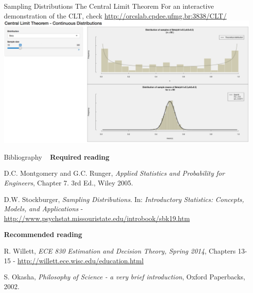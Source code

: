 \documentclass[t]{beamer}
\begin{document}
\begin{ftst}
{Sampling Distributions}
{The Central Limit Theorem}
For an interactive demonstration of the CLT, check 
{\small\url{http://orcslab.cpdee.ufmg.br:3838/CLT/}}
\vone
{\centering\includegraphics[width=\textwidth]{../figs/CLTdemo.png}}
\end{ftst}



\begin{ftst}
{Bibliography}
{\ }
\scriptsize
\textbf{Required reading}

\benums D.C. Montgomery and G.C. Runger, \textit{Applied Statistics and Probability for Engineers}, Chapter 7. 3rd Ed., Wiley 2005.
\item D.W. Stockburger, \textit{Sampling Distributions}. In: \textit{Introductory Statistics: Concepts, Models, and Applications} - \url{http://www.psychstat.missouristate.edu/introbook/sbk19.htm}
\eenum

\textbf{Recommended reading}

\benums R. Willett, \textit{ ECE 830 Estimation and Decision Theory, Spring 2014}, Chapters 13-15 - \url{http://willett.ece.wisc.edu/education.html}
\item S. Okasha, \textit{Philosophy of Science - a very brief introduction}, Oxford Paperbacks, 2002.
\eenum
\end{ftst}



\end{document}
